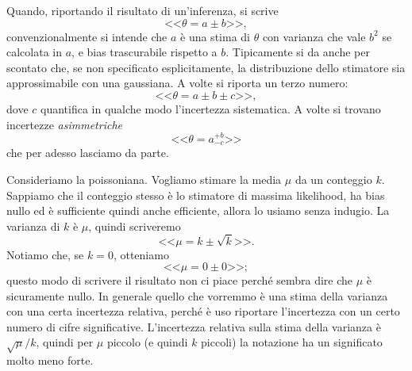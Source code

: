 

Quando, riportando il risultato di un'inferenza, si scrive
\begin{equation*}
	\text{<<}\theta = a \pm b\text{>>},
\end{equation*}
convenzionalmente si intende che $a$ è una stima di $\theta$ con varianza che vale $b^2$ se calcolata in $a$,
e bias trascurabile rispetto a $b$.
Tipicamente si da anche per scontato che,
se non specificato esplicitamente,
la distribuzione dello stimatore sia approssimabile con una gaussiana.
A volte si riporta un terzo numero:
\begin{equation*}
	\text{<<}\theta = a \pm b \pm c\text{>>},
\end{equation*}
dove $c$ quantifica in qualche modo l'incertezza sistematica.
A volte si trovano incertezze \emph{asimmetriche}
\begin{equation*}
	\text{<<}\theta = a^{+b}_{-c}\text{>>}
\end{equation*}
che per adesso lasciamo da parte.

\begin{example}
	Consideriamo la poissoniana.
	Vogliamo stimare la media $\mu$ da un conteggio $k$.
	Sappiamo che il conteggio stesso è lo stimatore di massima likelihood,
	ha bias nullo ed è sufficiente quindi anche efficiente,
	allora lo usiamo senza indugio.
	La varianza di $k$ è $\mu$,
	quindi scriveremo
	\begin{equation*}
		\text{<<}\mu = k \pm \sqrt k\text{>>}.
	\end{equation*}
	Notiamo che, se $k=0$, otteniamo
	\begin{equation*}
		\text{<<}\mu = 0 \pm 0\text{>>};
	\end{equation*}
	questo modo di scrivere il risultato non ci piace perché sembra dire che $\mu$ è sicuramente nullo.
	In generale quello che vorremmo è una stima della varianza con una certa incertezza relativa,
	perché è uso riportare l'incertezza con un certo numero di cifre significative.
	L'incertezza relativa sulla stima della varianza è $\sqrt\mu / k$,
	quindi per $\mu$ piccolo (e quindi $k$ piccoli) la notazione ha un significato molto meno forte.
\end{example}

